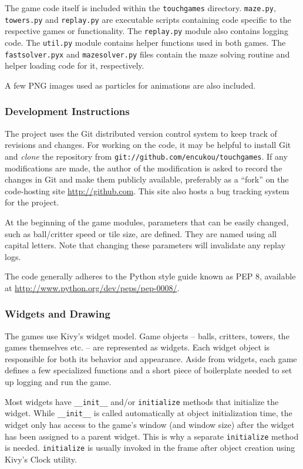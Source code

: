 \documentclass[a4paper,11pt]{article}
\begin{document}
The game code itself is included within the \texttt{touchgames} directory.
\texttt{maze.py}, \texttt{towers.py} and \texttt{replay.py} are executable
scripts containing code specific to the respective games or functionality.
The \texttt{replay.py} module also contains logging code.
The \texttt{util.py} module contains helper functions used in both games.
The \texttt{fastsolver.pyx} and \texttt{mazesolver.py} files contain the maze
solving routine and helper loading code for it, respectively.

A few PNG images used as particles for animations are also included.

\subsubsection{Development Instructions}

The project uses the Git distributed version control system to keep track of
revisions and changes.
For working on the code, it may be helpful to install Git and \emph{clone}
the repository from \texttt{git://github.com/encukou/touchgames}.
If any modifications are made, the author of the modification is asked to
record the changes in Git and make them publicly available, preferably as a
“fork” on the code-hosting site \url{http://github.com}.
This site also hosts a bug tracking system for the project.

At the beginning of the game modules, parameters that can be easily changed,
such as ball/critter speed or tile size, are defined.
They are named using all capital letters.
Note that changing these parameters will invalidate any replay logs.

The code generally adheres to the Python style guide known as PEP 8, available
at \url{http://www.python.org/dev/peps/pep-0008/}.

\subsubsection{Widgets and Drawing}

The games use Kivy's widget model.
Game objects – balls, critters, towers, the games themselves etc. – are
represented as widgets.
Each widget object is responsible for both its behavior and appearance.
Aside from widgets, each game defines a few specialized functions
and a short piece of boilerplate needed to set up logging and run the game.

Most widgets have \texttt{\_\_init\_\_} and/or \texttt{initialize} methods that
initialize the widget.
While \texttt{\_\_init\_\_} is called automatically at object initialization
time, the widget only has access to the game's window (and window size) after
the widget has been assigned to a parent widget. This is why a separate
\texttt{initialize} method is needed.
\texttt{initialize} is usually invoked in the frame after object creation
using Kivy's Clock utility.
\end{document}
